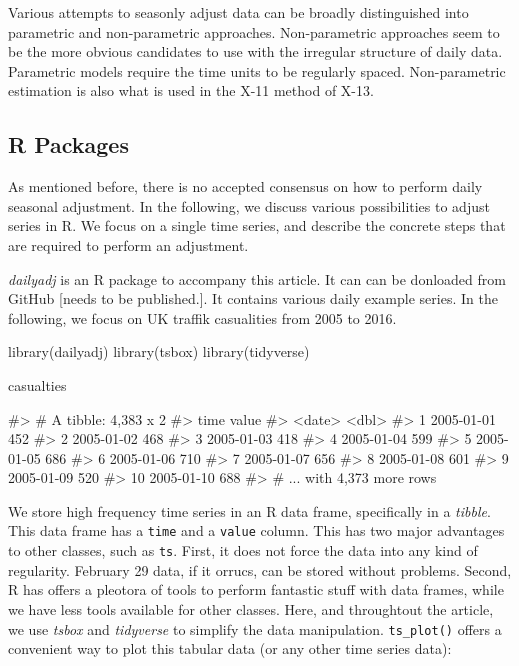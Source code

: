 Various attempts to seasonly adjust data can be broadly distinguished
into parametric and non-parametric approaches. Non-parametric approaches
seem to be the more obvious candidates to use with the irregular
structure of daily data. Parametric models require the time units to be
regularly spaced. Non-parametric estimation is also what is used in the
X-11 method of X-13.

\hypertarget{r-packages}{%
\subsection{R Packages}\label{r-packages}}

As mentioned before, there is no accepted consensus on how to perform
daily seasonal adjustment. In the following, we discuss various
possibilities to adjust series in R. We focus on a single time series,
and describe the concrete steps that are required to perform an
adjustment.

\emph{dailyadj} is an R package to accompany this article. It can can be
donloaded from GitHub {[}needs to be published.{]}. It contains various
daily example series. In the following, we focus on UK traffik
casualities from 2005 to 2016.

\begin{Schunk}
\begin{Sinput}
library(dailyadj)
library(tsbox)
library(tidyverse)

casualties
\end{Sinput}
\begin{Soutput}
#> # A tibble: 4,383 x 2
#>    time       value
#>    <date>     <dbl>
#>  1 2005-01-01   452
#>  2 2005-01-02   468
#>  3 2005-01-03   418
#>  4 2005-01-04   599
#>  5 2005-01-05   686
#>  6 2005-01-06   710
#>  7 2005-01-07   656
#>  8 2005-01-08   601
#>  9 2005-01-09   520
#> 10 2005-01-10   688
#> # ... with 4,373 more rows
\end{Soutput}
\end{Schunk}

We store high frequency time series in an R data frame, specifically in
a \emph{tibble}. This data frame has a \texttt{time} and a
\texttt{value} column. This has two major advantages to other classes,
such as \texttt{ts}. First, it does not force the data into any kind of
regularity. February 29 data, if it orrucs, can be stored without
problems. Second, R has offers a pleotora of tools to perform fantastic
stuff with data frames, while we have less tools available for other
classes. Here, and throughtout the article, we use \emph{tsbox} and
\emph{tidyverse} to simplify the data manipulation. \texttt{ts\_plot()}
offers a convenient way to plot this tabular data (or any other time
series data):

